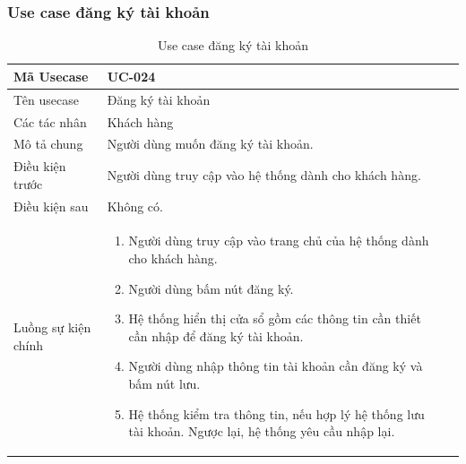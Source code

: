 \documentclass[12pt,a4paper]{article}
\begin{document}
    \subsubsection*{Use case đăng ký tài khoản}
    \begin{table}[H]
        \centering
        \begin{tabular}{|p{3.5cm}|p{11.5cm}|c|}
            \hline
            Mã Usecase      & UC-024                                                \\
            \hline
            Tên usecase     & Đăng ký tài khoản                                     \\
            \hline
            Các tác nhân    & Khách hàng                                            \\
            \hline
            Mô tả chung     & Người dùng muốn đăng ký tài khoản.                    \\
            \hline

            Điều kiện trước & Người dùng truy cập vào hệ thống dành cho khách hàng. \\
            \hline

            Điều kiện sau   & Không có.                                             \\
            \hline

            Luồng sự kiện chính & \vspace{-.8cm}\begin{enumerate}
                                                    \item Người dùng truy cập vào trang chủ của hệ thống dành cho khách hàng.
                                                    \item Người dùng bấm nút đăng ký.
                                                    \item Hệ thống hiển thị cửa sổ gồm các thông tin cần thiết cần nhập để đăng ký tài khoản.
                                                    \item Người dùng nhập thông tin tài khoản cần đăng ký và bấm nút lưu.
                                                    \item Hệ thống kiểm tra thông tin, nếu hợp lý hệ thống lưu tài khoản. Ngược lại, hệ thống yêu cầu nhập lại.
            \end{enumerate}
            \\
            \hline
        \end{tabular}
        \caption{Use case đăng ký tài khoản}

    \end{table}
\end{document}
